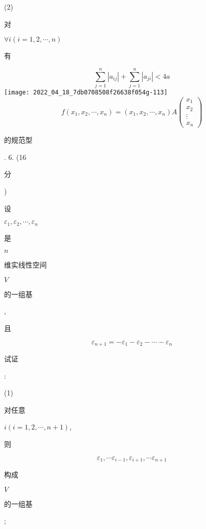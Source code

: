 \documentclass[10pt]{article}
\begin{document}
(2) \begin{CJK}{UTF8}{mj}对\end{CJK} $\forall i(i=1,2, \cdots, n)$ \begin{CJK}{UTF8}{mj}有\end{CJK}
$$
\sum_{j=1}^{n}\left|a_{i j}\right|+\sum_{j=1}^{n}\left|a_{j i}\right|<4 a
$$
\texttt{[image: 2022\_04\_18\_7db0708508f26638f054g-113]}
$$
f\left(x_{1}, x_{2}, \cdots, x_{n}\right)=\left(x_{1}, x_{2}, \cdots, x_{n}\right) A\left(\begin{array}{c}
x_{1} \\
x_{2} \\
\vdots \\
x_{n}
\end{array}\right)
$$
\begin{CJK}{UTF8}{mj}的规范型\end{CJK}. 6. (16 \begin{CJK}{UTF8}{mj}分\end{CJK}) \begin{CJK}{UTF8}{mj}设\end{CJK} $\varepsilon_{1}, \varepsilon_{2}, \cdots, \varepsilon_{n}$ \begin{CJK}{UTF8}{mj}是\end{CJK} $n$ \begin{CJK}{UTF8}{mj}维实线性空间\end{CJK} $V$ \begin{CJK}{UTF8}{mj}的一组基\end{CJK}, \begin{CJK}{UTF8}{mj}且\end{CJK}
$$
\varepsilon_{n+1}=-\varepsilon_{1}-\varepsilon_{2}-\cdots-\varepsilon_{n}
$$
\begin{CJK}{UTF8}{mj}试证\end{CJK}:

(1) \begin{CJK}{UTF8}{mj}对任意\end{CJK} $i(i=1,2, \cdots, n+1)$, \begin{CJK}{UTF8}{mj}则\end{CJK}
$$
\varepsilon_{1}, \cdots \varepsilon_{i-1}, \varepsilon_{i+1}, \cdots \varepsilon_{n+1}
$$
\begin{CJK}{UTF8}{mj}构成\end{CJK} $V$ \begin{CJK}{UTF8}{mj}的一组基\end{CJK};
\end{document}
